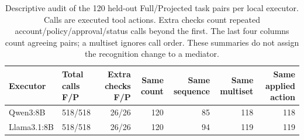\begin{table}[t]\centering\small
\caption{Descriptive audit of the 120 held-out Full/Projected task pairs per local executor. Calls are executed tool actions. Extra checks count repeated account/policy/approval/status calls beyond the first. The last four columns count agreeing pairs; a multiset ignores call order. These summaries do not assign the recognition change to a mediator.}\label{tab:paired-path-diagnostics}
\setlength{\tabcolsep}{3pt}
\begin{tabularx}{\textwidth}{@{}lYrrrrr@{}}\toprule
Executor & Total calls F/P & Extra checks F/P & Same count & Same sequence & Same multiset & Same applied action \\\midrule
Qwen3:8B & 518/518 & 26/26 & 120 & 85 & 118 & 118 \\
Llama3.1:8B & 518/518 & 26/26 & 120 & 94 & 119 & 119 \\
\bottomrule\end{tabularx}
\end{table}
